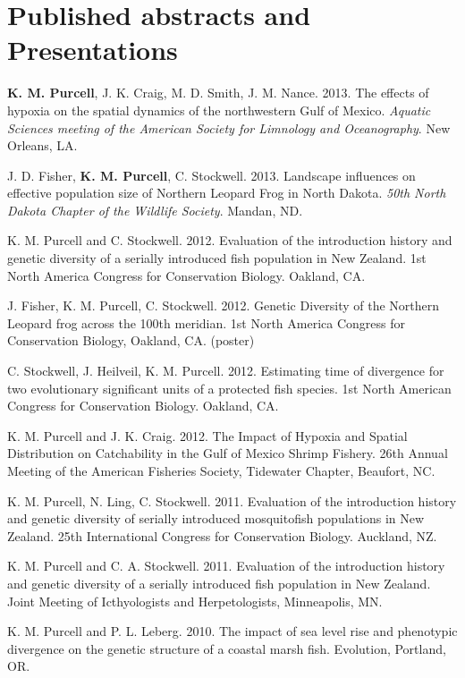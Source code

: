 \documentclass[letterpaper]{article}
\renewenvironment{itemize}{
  \begin{list}{}{
    \setlength{\leftmargin}{1em}
  }
}{
  \end{list}
}
\begin{document}
\section*{Published abstracts and Presentations}
	\begin{itemize}
		\item \textbf{K. M. Purcell}, J. K. Craig, M. D. Smith, J. M. Nance. 2013. The effects of hypoxia on the spatial dynamics of the northwestern Gulf of Mexico. \textit{Aquatic Sciences meeting of the American Society for Limnology and Oceanography}. New Orleans, LA.
		\item J. D. Fisher, \textbf{K. M. Purcell}, C. Stockwell. 2013. Landscape influences on effective population size of Northern Leopard Frog in North Dakota. \textit{50th North Dakota Chapter of the Wildlife Society}. Mandan, ND.
		\item K. M. Purcell and C. Stockwell. 2012. Evaluation of the introduction history and genetic diversity of a serially introduced fish population in New Zealand. 1st North America Congress for Conservation Biology. Oakland, CA.
		\item J. Fisher, K. M. Purcell, C. Stockwell. 2012. Genetic Diversity of the Northern Leopard frog across the 100th meridian. 1st North America Congress for Conservation Biology, Oakland, CA. (poster)
		\item C. Stockwell, J. Heilveil, K. M. Purcell. 2012. Estimating time of divergence for two evolutionary significant units of a protected fish species. 1st North American Congress for Conservation Biology. Oakland, CA.
		\item K. M. Purcell and J. K. Craig. 2012. The Impact of Hypoxia and Spatial Distribution on Catchability in the Gulf of Mexico Shrimp Fishery. 26th Annual Meeting of the American Fisheries Society, Tidewater Chapter, Beaufort, NC.
		\item K. M. Purcell, N. Ling, C. Stockwell. 2011. Evaluation of the introduction history and genetic diversity of serially introduced mosquitofish populations in New Zealand. 25th International Congress for Conservation Biology. Auckland, NZ.
		\item K. M. Purcell and C. A. Stockwell. 2011. Evaluation of the introduction history and genetic diversity of a serially introduced fish population in New Zealand. Joint Meeting of Icthyologists and Herpetologists, Minneapolis, MN.
		\item K. M. Purcell and P. L. Leberg. 2010. The impact of sea level rise and phenotypic divergence on the genetic structure of a coastal marsh fish. Evolution, Portland, OR.

\end{itemize}
\end{document}
